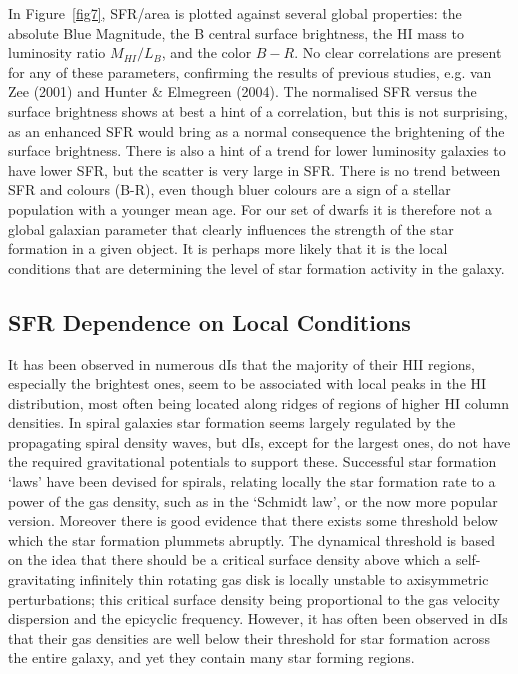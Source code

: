 \documentclass[preprint]{aastex}
\begin{document}
In Figure~\ref{fig7}, SFR/area is plotted 
against several global properties: the absolute Blue Magnitude,
the B central surface brightness, the HI mass to luminosity ratio $M_{HI}/L_B$,
and the color $B-R$. No clear correlations are present for any of
these parameters, confirming the results of previous studies, e.g. van Zee (2001)
and Hunter \& Elmegreen (2004). 
The normalised
SFR versus the surface brightness shows at best a hint of a correlation,
but this is not surprising, as an enhanced SFR would bring as a normal consequence
the brightening of the surface brightness. There is also a hint of a trend
for lower luminosity galaxies to have lower SFR, but the scatter is very large
in SFR. There is no trend between SFR and colours (B-R), even though bluer
colours are a sign of a stellar population with a younger mean age.
For our set of dwarfs it is therefore not a global galaxian parameter 
that clearly influences the strength of the
star formation in a given object. It is perhaps more likely that 
it is the local conditions that are determining the level of star formation 
activity in the galaxy.

\subsection{SFR Dependence on Local Conditions}

It has been observed in numerous dIs that the majority of their HII regions,
especially the brightest ones, seem to be associated with local peaks in the
HI distribution, most often being located along ridges of regions of higher
HI column densities. In spiral galaxies star formation seems largely regulated
by the propagating spiral density waves, but dIs, except for the largest ones,
do not have the required gravitational potentials to support these. Successful star  
formation `laws' have been devised for spirals, relating locally the star 
formation rate to a power of the gas density, such as in the `Schmidt law',
or the now more popular \citet{k98} version. Moreover there is good evidence
that there exists some threshold below which the star formation plummets abruptly. 
The \citet{t64} dynamical threshold \citep[see also][]{k89} is based on the idea
that there should be a critical surface density above which a self-gravitating
infinitely thin rotating gas disk is locally unstable to axisymmetric perturbations; 
this critical surface density being proportional to the gas velocity dispersion 
and the epicyclic frequency. However, it has often been observed in dIs that
their gas densities are well below their threshold for star formation across
the entire galaxy, and yet they contain many star forming regions.
\end{document}
